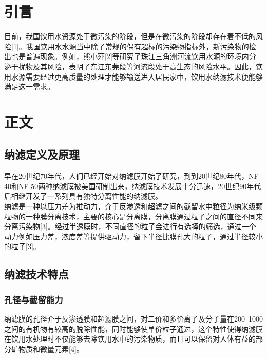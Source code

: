 \documentclass[a4paper,onecolumn,twoside]{article}
\begin{document}

\begin{multicols}{2}
  \section{引言}
  目前，我国饮用水资源处于微污染的阶段，但是在微污染的阶段却存在着不低的风险[1]。我国饮用水水源当中除了常规的偶有超标的污染物指标外，新污染物的检出也是普遍现象。例如，熊小萍[2]等研究了珠江三角洲河流饮用水源的环境内分泌干扰物及其风险，表明了东江东莞段等河流段处于高生态的风险水平。因此，饮用水源需要经过更高质量的处理才能够输送进入居民家中，饮用水纳滤技术便能够满足这一需求。
  \section{正文}     
  \subsection{纳滤定义及原理}
  早在20世纪70年代，人们已经开始对纳滤膜开始了研究，到到20世纪80年代，NF-40和NF-50两种纳滤膜被美国研制出来，纳滤膜技术发展十分迅速，20世纪90年代后相继开发了一系列具有独特分离性能的纳滤膜。\\
  纳滤是一种以压力差为推动力，介于反渗透和超滤之间的截留水中粒径为纳米级颗粒物的一种膜分离技术，主要的核心是分离膜，分离膜通过粒子之间的直径不同来分离污染物[3]。经过半透膜时，不同直径的粒子会进行有选择的筛选，通过一个动力例如压力差，浓度差等提供驱动力，留下半径比膜孔大的粒子，通过半径较小的粒子[3]。
    \subsection{纳滤技术特点} 
    \subsubsection{孔径与截留能力}
  纳滤膜的孔径介于反渗透膜和超滤膜之间，对二价和多价离子及分子量在200~1000之间的有机物有较高的脱除性能，同时能够使单价粒子通过，这个特性使得纳滤膜在饮用水处理时不仅能够去除饮用水中的污染物质，而且可以保留对人体有益的部分矿物质和微量元素[4]。

\end{multicols}
\end{document}
